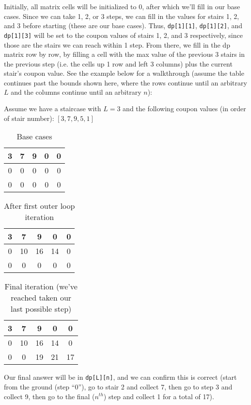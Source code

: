 \documentclass[12pt]{article}
\begin{document}
\begin{enumerate}
    Initially, all matrix cells will be initialized to 0, after which we'll fill in our base cases. Since we can take 1, 2, or 
    3 steps, we can fill in the values for stairs 1, 2, and 3 before starting (these are our base cases). Thus, 
    \texttt{dp[1][1]}, \texttt{dp[1][2]}, and \texttt{dp[1][3]} will be set to the coupon values of stairs 1, 2, and 3 
    respectively, since those are the stairs we can reach within 1 step. From there, we fill in the dp matrix row by row, 
    by filling a cell with the max value of the previous 3 stairs in the previous step (i.e. the cells up 1 row and 
    left 3 columns) plus the current stair's coupon value. See the example below for a walkthrough (assume the table 
    continues past the bounds shown here, where the rows continue until an arbitrary $L$ and the columns continue until 
    an arbitrary $n$):

    Assume we have a staircase with $L = 3$ and the following coupon values (in order of stair number): $[3, 7, 9, 5, 1]$

    \begin{table}[h!]
        \centering
        \begin{tabular}{|c|c|c|c|c|} \hline
            3 & 7 & 9 & 0 & 0 \\ \hline
            0 & 0 & 0 & 0 & 0 \\ \hline
            0 & 0 & 0 & 0 & 0 \\ \hline
        \end{tabular}
        \caption{Base cases}
    \end{table}

    \newpage

    \begin{table}[h!]
        \centering
        \begin{tabular}{|c|c|c|c|c|} \hline
            3 & 7   & 9      & 0    & 0 \\ \hline
            0 & 10  & 16     & 14   & 0 \\ \hline
            0 & 0   & 0     & 0   & 0 \\ \hline
        \end{tabular}
        \caption{After first outer loop iteration}
    \end{table}

    \begin{table}[h!]
        \centering
        \begin{tabular}{|c|c|c|c|c|} \hline
            3 & 7   & 9      & 0    & 0 \\ \hline
            0 & 10  & 16     & 14   & 0 \\ \hline
            0 & 0   & 19     & 21   & 17 \\ \hline
        \end{tabular}
        \caption{Final iteration (we've reached taken our last possible step)}
    \end{table}

    Our final answer will be in \texttt{dp[L][n]}, and we can confirm this is correct (start from the ground (step ``0''), 
    go to stair 2 and collect 7, then go to step 3 and collect 9, then go to the final ($n^{th}$) step and collect 1 for 
    a total of 17).

\end{enumerate}
\end{document}

